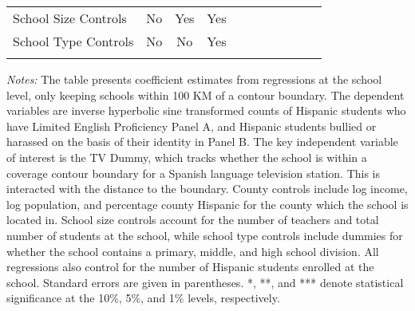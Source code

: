 \begin{table}[!h]
{\begin{threeparttable}
\begin{tabular}{lcccccccccc}
                                School Size Controls & No & Yes & Yes\\
                                School Type Controls & No & No & Yes \\
				\addlinespace\hline\hline
			\end{tabular}
			\begin{tablenotes}[flushleft]
				\item \textit{Notes:} The table presents coefficient estimates from regressions at the school level, only keeping schools within 100 KM of a contour boundary. The dependent variables are inverse hyperbolic sine transformed counts of Hispanic students who have Limited English Proficiency Panel A, and Hispanic students bullied or harassed on the basis of their identity in Panel B. The key independent variable of interest is the TV Dummy, which tracks whether the school is within a coverage contour boundary for a Spanish language television station. This is interacted with the distance to the boundary. County controls include log income, log population, and percentage county Hispanic for the county which the school is located in. School size controls account for the number of teachers and total number of students at the school, while school type controls include dummies for whether the school contains a primary, middle, and high school division. All regressions also control for the number of Hispanic students enrolled at the school. Standard errors are given in parentheses. *, **, and *** denote statistical significance at the 10\%, 5\%, and 1\% levels, respectively.
			\end{tablenotes}
		\end{threeparttable}
	}
\end{table}